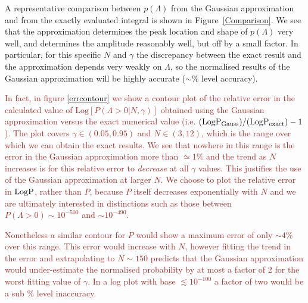 \documentclass[12pt]{article}
\newcommand{\sh}[1]{\textcolor{brown}{#1}}
\begin{document}

A representative comparison between $p(\Lambda)$ from the Gaussian approximation and from the exactly evaluated integral is shown in Figure~\ref{Comparison}. We see that the approximation determines the peak location and shape of $p(\Lambda)$ very well, and determines the amplitude reasonably well, but off by a small factor. In particular, for this specific $N$ and $\gamma$ the discrepancy between the exact result and the approximation depends very weakly on $\Lambda$, so the normalised results of the Gaussian approximation will be highly accurate ($\sim\%$ level accuracy).

\sh{In fact, in figure \ref{errcontour} we show a contour plot of the relative error in the calculated value of $\mathrm{Log} \left[P(\Lambda>0|N,\gamma)\right]$ obtained using the Gaussian approximation versus the exact numerical value (i.e. $(\rm{Log} P_{\rm Gauss})/(\rm{Log} P_{\rm exact}) -1$). The plot covers $\gamma \in (0.05,0.95)$ and $N \in (3,12)$, which is the range over which we can obtain the exact results. We see that nowhere in this range is the error in the Gaussian approximation more than $\simeq 1\%$ and the trend as $N$ increases is for this relative error to \emph{decrease} at all $\gamma$ values. This justifies the use of the Gaussian approximation at larger $N$. We choose to plot the relative error in $\rm{Log} P$, rather than $P$, because $P$ itself decreases exponentially with $N$ and we are ultimately interested in distinctions such as those between $P(\Lambda>0) \sim 10^{-500}$ and $\sim 10^{-490}$.}

\sh{Nonetheless a similar contour for $P$ would show a maximum error of only $\sim 4\%$ over this range. This error would increase with $N$, however fitting the trend in the error and extrapolating to $N\sim 150$ predicts that the Gaussian approximation would under-estimate the normalised probability by at most a factor of $2$ for the worst fitting value of $\gamma$. In a log plot with base $\lesssim 10^{-100}$ a factor of two would be a sub $\%$ level inaccuracy.}

\end{document}
